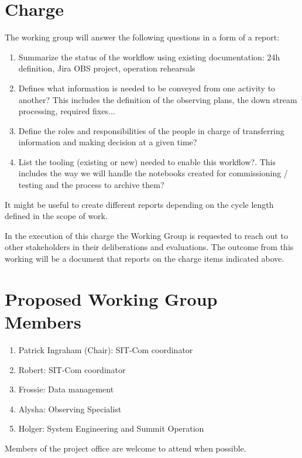 \documentclass[SE,authoryear,toc]{lsstdoc}
\begin{document}
\section{Charge}
The working group will answer the following questions in a form of a report:
\begin{enumerate}
\item{Summarize the status of the workflow using existing documentation: 24h definition, Jira OBS project, operation rehearsals}
\item{Defines what information is needed to be conveyed from one activity to another? This includes the definition of the observing plans, the down stream processing, required fixes...} 
\item{Define the roles and responsibilities of the people in charge of transferring information and making decision at a given time?}
\item{List the tooling (existing or new) needed  to enable this workflow?. This includes the way we will handle the notebooks created for commissioning / testing and the process to archive them?}
\end{enumerate}

It might be useful to create different reports depending on the cycle length defined in the scope of work.

In the execution of this charge the Working Group is requested to reach out to other stakeholders in their deliberations and evaluations.
The outcome from this working will be a document that reports on the charge items indicated above.

\section{Proposed Working Group Members}
\begin{enumerate}
\item Patrick Ingraham (Chair): SIT-Com coordinator 
\item Robert: SIT-Com coordinator
\item Frossie: Data management 
\item Alysha: Observing Specialist
\item Holger: System Engineering and Summit Operation
\end{enumerate}

Members of the project office are welcome to attend when possible. 

\appendix
\end{document}
